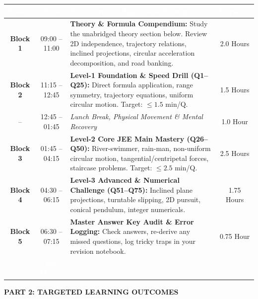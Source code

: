 \documentclass[11pt,a4paper]{article}
\begin{document}
\begin{center}
\renewcommand{\arraystretch}{1.25}
\small
\begin{tabularx}{\textwidth}{|c|c|X|c|}
\hline
\rowcolor{tableDarkHeader}
\textcolor{white}{\textbf{Session}} & \textcolor{white}{\textbf{Time}} & \textcolor{white}{\textbf{Focus Area \& High-Yield Strategy}} & \textcolor{white}{\textbf{Duration}} \\
\hline
\rowcolor{white}
\textbf{Block 1} & 09:00 -- 11:00 & \textbf{Theory \& Formula Compendium:} Study the unabridged theory section below. Review 2D independence, trajectory relations, inclined projections, circular acceleration decomposition, and road banking. & 2.0 Hours \\
\hline
\rowcolor{tableStripe}
\textbf{Block 2} & 11:15 -- 12:45 & \textbf{Level-1 Foundation \& Speed Drill (Q1--Q25):} Direct formula application, range symmetry, trajectory equations, uniform circular motion. Target: $\le 1.5$ min/Q. & 1.5 Hours \\
\hline
\rowcolor{white}
-- & 12:45 -- 01:45 & \textit{Lunch Break, Physical Movement \& Mental Recovery} & 1.0 Hour \\
\hline
\rowcolor{tableStripe}
\textbf{Block 3} & 01:45 -- 04:15 & \textbf{Level-2 Core JEE Main Mastery (Q26--Q50):} River-swimmer, rain-man, non-uniform circular motion, tangential/centripetal forces, staircase problems. Target: $\le 2.5$ min/Q. & 2.5 Hours \\
\hline
\rowcolor{white}
\textbf{Block 4} & 04:30 -- 06:15 & \textbf{Level-3 Advanced \& Numerical Challenge (Q51--Q75):} Inclined plane projections, turntable slipping, 2D pursuit, conical pendulum, integer numericals. & 1.75 Hours \\
\hline
\rowcolor{tableStripe}
\textbf{Block 5} & 06:30 -- 07:15 & \textbf{Master Answer Key Audit \& Error Logging:} Check answers, re-derive any missed questions, log tricky traps in your revision notebook. & 0.75 Hour \\
\hline
\rowcolor{tableDarkHeader}
\multicolumn{3}{|r|}{\textcolor{white}{\textbf{TOTAL DEDICATED STUDY TIME}}} & \textcolor{white}{\textbf{8.0 Hours}} \\
\hline
\end{tabularx}
\end{center}

\vspace{5pt}

\begin{tcolorbox}[sectionbanner]
  {\large \textbf{\textsf{PART 2: TARGETED LEARNING OUTCOMES}}}
\end{tcolorbox}
\vspace{3pt}
\end{document}
